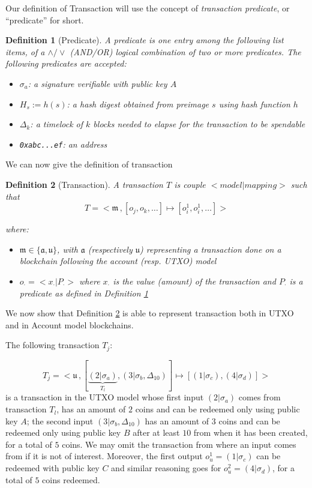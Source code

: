 \documentclass[runningheads]{llncs}
\newcommand{\maccount}{\mathfrak{a}}
\newcommand{\mutxo}{\mathfrak{u}}
\newcommand{\model}{\mathfrak{m}}
\newcommand{\tx}[3]{<\mathfrak{#1}\,, [#2]\mapsto[#3]>}
\newcommand{\curlybelow}[2]{\underbrace{#1}_{#2}}
\newtheorem{deff}{Definition}
\begin{document}
Our definition of Transaction will use the concept of \emph{transaction predicate}, or ``predicate'' for short. 


\begin{deff}[Predicate]\label{def_predicate}
    A predicate is one entry among the following list items, of a $\land/\lor$ \emph{(AND/OR)} logical combination of two or more predicates. The following predicates are accepted:
    \begin{itemize}
        \item $\sigma_a$: a signature verifiable with public key $A$
        \item $H_s:=h(s)$: a hash digest obtained from preimage $s$ using hash function $h$
        \item $\Delta_k$: a timelock of $k$ blocks needed to elapse for the transaction to be spendable
        \item \texttt{0xabc...ef}: an address 
    \end{itemize}
\end{deff}

We can now give the definition of transaction
\begin{deff}[Transaction]\label{def_transaction}
    A transaction $T$ is couple $<model|mapping>$ such that
    $$
    T = \tx m {o_j,o_k,\dots}{o_i^1,o_i^1,\dots}
    $$

    where: 

    \begin{itemize}
        \item     $\model\in\{\maccount,\mutxo\}$, with $\maccount$ (respectively $\mutxo$) representing a transaction done on a blockchain following the account (resp. UTXO) model 
        \item $o_\cdot=<x_\cdot|P_\cdot>$ where $x_\cdot$ is the value (amount) of the transaction and $P_\cdot$ is a predicate as defined in Definition \ref{def_predicate}
    \end{itemize}

\end{deff}
We now show that Definition \ref{def_transaction} is able to represent transaction both in  UTXO and in  Account model blockchains.

The following transaction $T_j$:

$$
T_j = \tx u {\curlybelow{(2|\sigma_a)}{T_l},(3|\sigma_b,\Delta_{10})}{(1|\sigma_c),(4|\sigma_d)}
$$
is a transaction in the UTXO model whose first input $(2|\sigma_a)$ comes from transaction $T_l$, has an amount of $2$ coins and can be redeemed only using public key $A$; the second input $(3|\sigma_b,\Delta_{10})$ has an amount of $3$ coins and can be redeemed only using public key $B$ after at least $10$ from when it has been created, for a total of $5$ coins. We may omit the transaction from where an input comes from if it is not of interest. Moreover, the first output $o_u^1=(1|\sigma_c)$ can be redeemed with public key $C$ and similar reasoning goes for $o_u^2=(4|\sigma_d)$, for a total of $5$ coins redeemed.
\end{document}
